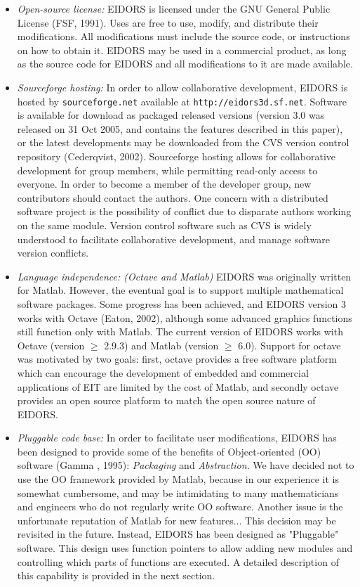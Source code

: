 \documentclass[12pt]{iopart}
\begin{document}
\begin{itemize}

  \item {\em Open-source license:}
EIDORS is licensed under the
GNU General Public License (FSF, 1991).
Uses are free to use, modify, and
distribute their modifications. All modifications must include the
source code, or instructions on how to obtain it. EIDORS may be used
in a commercial product, as long as the source code for EIDORS and all
modifications to it are made available.

  \item {\em Sourceforge hosting:}
In order to allow collaborative development, 
EIDORS is hosted by {\tt sourceforge.net}
available at {\tt http://eidors3d.sf.net}.
Software is available for download as packaged released versions
(version 3.0 was released on 31 Oct 2005, and
contains the features described in this paper),
or the latest developments may be downloaded from the
CVS version control repository (Cederqvist, 2002).
Sourceforge hosting allows for collaborative development for
group members, while permitting read-only access to everyone.
In order to become a member of the developer group, new
contributors should contact the authors.
One concern with a distributed software project is
the possibility of conflict due to disparate authors
working on the same module.
Version control software such as CVS is widely understood
to facilitate collaborative development, and manage
software version conflicts.


  \item {\em Language independence: (Octave and Matlab)}
EIDORS was originally written for Matlab.
However, the eventual goal is to support multiple
mathematical software packages.
Some progress has been achieved, and EIDORS version 3
works with Octave (Eaton, 2002), although some 
advanced graphics functions still function only with Matlab.
The current version of EIDORS works with Octave
(version $\ge$ 2.9.3)
and Matlab (version $\ge$ 6.0).
Support for octave was motivated by two goals:
first, octave provides a free software platform
which can encourage the development of embedded
and commercial applications of EIT
are limited by the cost of Matlab, and secondly
octave provides an open source platform to match
the open source nature of EIDORS.

  \item {\em Pluggable code base:}
In order to facilitate user modifications, EIDORS
has been designed to provide some of the benefits of
Object-oriented (OO) software (Gamma \etal, 1995):
{\em Packaging} and {\em Abstraction}.
We have decided not to
use the OO framework provided by Matlab, because
in our experience it is somewhat cumbersome,
and may be intimidating
to many mathematicians and engineers who do not 
regularly write OO software.
Another issue is the unfortunate reputation of
Matlab for new features...
This decision may
be revisited in the future.
Instead, EIDORS has been designed as 
"Pluggable" software. This design uses function
pointers to allow adding new modules and controlling
which parts of functions are executed.
A detailed description of this capability is
provided in the next section.


\end{itemize}
\end{document}
